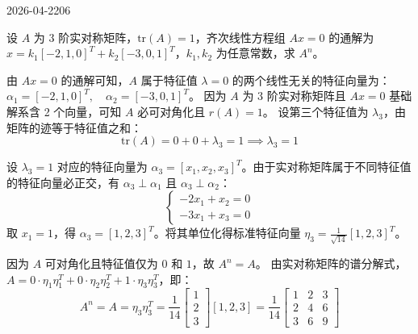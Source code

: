 \begin{mistake}{2026-04-22}{06}

\begin{problemcontent}
设 \(A\) 为 3 阶实对称矩阵，\(\text{tr}(A)=1\)，齐次线性方程组 \(Ax=0\) 的通解为 \(x=k_1[-2,1,0]^T + k_2[-3,0,1]^T\)，\(k_1, k_2\) 为任意常数，求 \(A^n\)。
\end{problemcontent}

\begin{solutioncontent}
由 \(Ax=0\) 的通解可知，\(A\) 属于特征值 \(\lambda=0\) 的两个线性无关的特征向量为：
\(\alpha_1 = [-2, 1, 0]^T, \quad \alpha_2 = [-3, 0, 1]^T\)。
因为 \(A\) 为 3 阶实对称矩阵且 \(Ax=0\) 基础解系含 2 个向量，可知 \(A\) 必可对角化且 \(r(A)=1\)。
设第三个特征值为 \(\lambda_3\)，由矩阵的迹等于特征值之和：
\[
\text{tr}(A) = 0 + 0 + \lambda_3 = 1 \implies \lambda_3 = 1
\]

设 \(\lambda_3=1\) 对应的特征向量为 \(\alpha_3 = [x_1, x_2, x_3]^T\)。由于实对称矩阵属于不同特征值的特征向量必正交，有 \(\alpha_3 \perp \alpha_1\) 且 \(\alpha_3 \perp \alpha_2\)：
\[
\begin{cases}
-2x_1 + x_2 = 0 \\
-3x_1 + x_3 = 0
\end{cases}
\]
取 \(x_1=1\)，得 \(\alpha_3 = [1, 2, 3]^T\)。将其单位化得标准特征向量 \(\eta_3 = \frac{1}{\sqrt{14}}[1, 2, 3]^T\)。

因为 \(A\) 可对角化且特征值仅为 \(0\) 和 \(1\)，故 \(A^n = A\)。
由实对称矩阵的谱分解式，\(A = 0\cdot\eta_1\eta_1^T + 0\cdot\eta_2\eta_2^T + 1\cdot\eta_3\eta_3^T\)，即：
\[
A^n = A = \eta_3 \eta_3^T = \frac{1}{14} \begin{bmatrix} 1 \\ 2 \\ 3 \end{bmatrix} [1, 2, 3] = \frac{1}{14} \begin{bmatrix} 1 & 2 & 3 \\ 2 & 4 & 6 \\ 3 & 6 & 9 \end{bmatrix}
\]
\end{solutioncontent}


\end{mistake}
